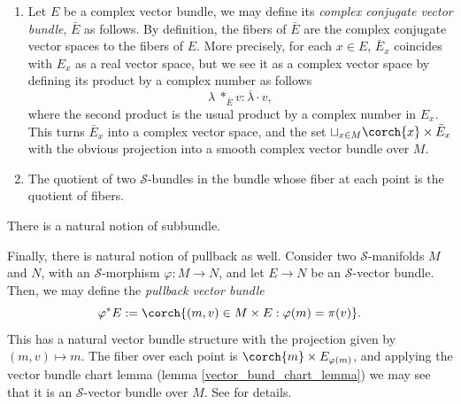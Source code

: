 \begin{example}
\begin{enumerate}
    \item Let \(E\) be a complex vector bundle, we may define its \textit{complex conjugate vector bundle}, \(\bar{E}\) as follows. By definition, the fibers of \(\bar{E}\) are the complex conjugate vector spaces to the fibers of \(E\). More precisely, for each \(x \in E\), \(\bar{E}_x\) coincides with \(E_x\) as a real vector space, but we see it as a complex vector space by defining its product by a complex number as follows 
    \[
    \lambda \ *_{\bar{E}} v:\overline{\lambda} \cdot v,
    \]
    where the second product is the usual product by a complex number in \(E_x\). This turns \(\bar{E}_x\) into a complex vector space, and the set \(\sqcup_{x \in M} \corch{x} \times \bar{E}_x\) with the obvious projection into a smooth complex vector bundle over \(M\).
    \item The quotient of two \(\mathcal{S}\)-bundles in the bundle whose fiber at each point is the quotient of fibers.
    \end{enumerate}
\end{example}

There is a natural notion of subbundle.


Finally, there is natural notion of pullback as well. Consider two \(\mathcal{S}\)-manifolds \(M\) and \(N\), with an \(\mathcal{S}\)-morphism \(\varphi\colon M \to N\), and let \(E\to N\) be an \(\mathcal{S}\)-vector bundle. Then, we may define the \textit{pullback vector bundle}
\begin{equation} \label{def_pullback_vec_bund}
    \varphi^*E:=\corch{(m, v)\in M \times E: \varphi(m)=\pi(v)}.
\end{equation}
This has a natural vector bundle structure with the projection given by \((m,v)\mapsto m\). The fiber over each point is \(\corch{m}\times E_{\varphi(m)}\), and applying the vector bundle chart lemma (lemma \ref{vector_bund_chart_lemma}) we may see that it is an \(\mathcal{S}\)-vector bundle over \(M\). See \parencite[Page 75]{lee_introCM} for details.

